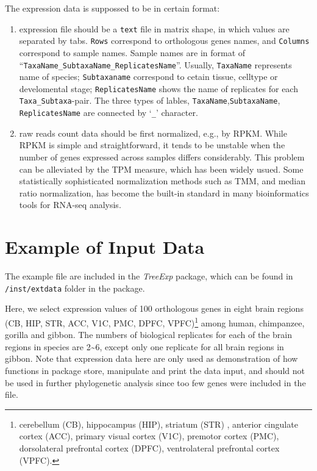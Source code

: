 \documentclass[]{book}
\let\rmarkdownfootnote\footnote%
\def\footnote{\protect\rmarkdownfootnote}
\begin{document}
The expression data is suppossed to be in certain format:

\begin{enumerate}
\def\labelenumi{\arabic{enumi}.}
\item
  expression file should be a \texttt{text} file in matrix shape, in which values are separated by tabs. \texttt{Rows} correspond to orthologous genes names, and \texttt{Columns} correspond to sample names. Sample names are in format of ``\texttt{TaxaName\_SubtaxaName\_ReplicatesName}''. Usually, \texttt{TaxaName} represents name of species; \texttt{Subtaxaname} correspond to cetain tissue, celltype or develomental stage; \texttt{ReplicatesName} shows the name of replicates for each \texttt{Taxa\_Subtaxa}-pair. The three types of lables, \texttt{TaxaName},\texttt{SubtaxaName}, \texttt{ReplicatesName} are connected by `\texttt{\_}' character.
\item
  raw reads count data should be first normalized, e.g., by RPKM. While RPKM is simple and straightforward, it tends to be unstable when the number of genes expressed across samples differs considerably. This problem can be alleviated by the TPM measure, which has been widely usued. Some statistically sophisticated normalization methods such as TMM, and median ratio normalization, has become the built-in standard in many bioinformatics tools for RNA-seq analysis\citep{robinson2010}.
\end{enumerate}

\hypertarget{example-of-input-data}{%
\section{Example of Input Data}\label{example-of-input-data}}

The example file are included in the \emph{TreeExp} package, which can be found in \texttt{/inst/extdata} folder in the package.

Here, we select expression values of 100 orthologous genes in eight brain regions (CB, HIP, STR, ACC, V1C, PMC, DPFC, VPFC)\footnote{cerebellum (CB), hippocampus (HIP), striatum (STR) , anterior cingulate cortex (ACC), primary visual cortex (V1C), premotor cortex (PMC), dorsolateral prefrontal cortex (DPFC),
  ventrolateral prefrontal cortex (VPFC).} among human, chimpanzee, gorilla and gibbon\citep{xu2018}.
The numbers of biological replicates for each of the brain regions in species are 2\textasciitilde{}6, except only one replicate for all brain regions in gibbon.
Note that expression data here are only used as demonstration of how functions in package store, manipulate and print the data input, and should not be used in further phylogenetic analysis since too few genes were included in the file.
\end{document}
